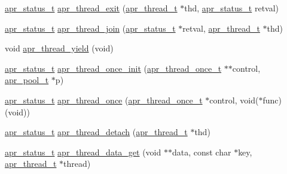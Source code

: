 \begin{DoxyCompactItemize}
\item 
\hyperlink{group__apr__errno_gaf76ee4543247e9fb3f3546203e590a6c}{apr\-\_\-status\-\_\-t} \hyperlink{group__apr__thread__proc_ga0e35365e530578bca1b4bea522ac8c85}{apr\-\_\-thread\-\_\-exit} (\hyperlink{group__apr__thread__proc_ga646c71351e723d84f8cc8c8d1d5937be}{apr\-\_\-thread\-\_\-t} $\ast$thd, \hyperlink{group__apr__errno_gaf76ee4543247e9fb3f3546203e590a6c}{apr\-\_\-status\-\_\-t} retval)
\item 
\hyperlink{group__apr__errno_gaf76ee4543247e9fb3f3546203e590a6c}{apr\-\_\-status\-\_\-t} \hyperlink{group__apr__thread__proc_ga1b950f36fa5bcd5a64887073f46f6d13}{apr\-\_\-thread\-\_\-join} (\hyperlink{group__apr__errno_gaf76ee4543247e9fb3f3546203e590a6c}{apr\-\_\-status\-\_\-t} $\ast$retval, \hyperlink{group__apr__thread__proc_ga646c71351e723d84f8cc8c8d1d5937be}{apr\-\_\-thread\-\_\-t} $\ast$thd)
\item 
void \hyperlink{group__apr__thread__proc_gacd69fb862c069cb6f297f65d64b5c102}{apr\-\_\-thread\-\_\-yield} (void)
\item 
\hyperlink{group__apr__errno_gaf76ee4543247e9fb3f3546203e590a6c}{apr\-\_\-status\-\_\-t} \hyperlink{group__apr__thread__proc_ga63f3bf667151053e45d5a2029daeda0d}{apr\-\_\-thread\-\_\-once\-\_\-init} (\hyperlink{group__apr__thread__proc_ga91841bcf20d0579e8e6acc6d3c220ac1}{apr\-\_\-thread\-\_\-once\-\_\-t} $\ast$$\ast$control, \hyperlink{group__apr__pools_gaf137f28edcf9a086cd6bc36c20d7cdfb}{apr\-\_\-pool\-\_\-t} $\ast$p)
\item 
\hyperlink{group__apr__errno_gaf76ee4543247e9fb3f3546203e590a6c}{apr\-\_\-status\-\_\-t} \hyperlink{group__apr__thread__proc_ga8f3645ee52ff07566c92181b4ce732d8}{apr\-\_\-thread\-\_\-once} (\hyperlink{group__apr__thread__proc_ga91841bcf20d0579e8e6acc6d3c220ac1}{apr\-\_\-thread\-\_\-once\-\_\-t} $\ast$control, void($\ast$func)(void))
\item 
\hyperlink{group__apr__errno_gaf76ee4543247e9fb3f3546203e590a6c}{apr\-\_\-status\-\_\-t} \hyperlink{group__apr__thread__proc_gadbd186912d5f6f2a19a175e1e02ba10e}{apr\-\_\-thread\-\_\-detach} (\hyperlink{group__apr__thread__proc_ga646c71351e723d84f8cc8c8d1d5937be}{apr\-\_\-thread\-\_\-t} $\ast$thd)
\item 
\hyperlink{group__apr__errno_gaf76ee4543247e9fb3f3546203e590a6c}{apr\-\_\-status\-\_\-t} \hyperlink{group__apr__thread__proc_gad799c8140ed068a12f1dbe134423eae7}{apr\-\_\-thread\-\_\-data\-\_\-get} (void $\ast$$\ast$data, const char $\ast$key, \hyperlink{group__apr__thread__proc_ga646c71351e723d84f8cc8c8d1d5937be}{apr\-\_\-thread\-\_\-t} $\ast$thread)

\end{DoxyCompactItemize}
